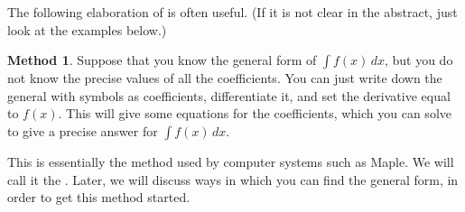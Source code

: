 \documentclass[a4paper]{book}
\theoremstyle{definition}
\newtheorem{method}[theorem]{Method}
\begin{document}
The following elaboration of  is often
useful.  (If it is not clear in the abstract, just look at the
examples below.)
\begin{method}
 Suppose that you know the general form of $\int f(x)\,dx$, but you do
 not know the precise values of all the coefficients.  You can just
 write down the general with symbols as coefficients, differentiate
 it, and set the derivative equal to $f(x)$.  This will give some
 equations for the coefficients, which you can solve to give a precise
 answer for $\int f(x)\,dx$.
\end{method}
This is essentially the method used by computer systems such as Maple.
We will call it the .
Later, we will discuss ways in which you can find the general form, in
order to get this method started.
\end{document}
